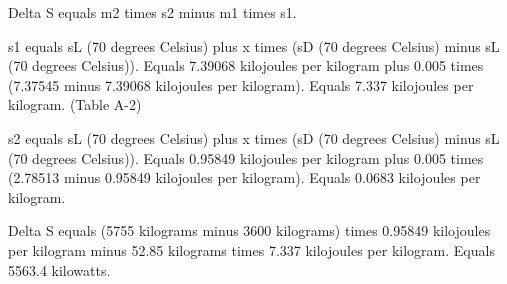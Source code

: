 Delta S equals m2 times s2 minus m1 times s1.  

s1 equals sL (70 degrees Celsius) plus x times (sD (70 degrees Celsius) minus sL (70 degrees Celsius)).  
Equals 7.39068 kilojoules per kilogram plus 0.005 times (7.37545 minus 7.39068 kilojoules per kilogram).  
Equals 7.337 kilojoules per kilogram.  
(Table A-2)  

s2 equals sL (70 degrees Celsius) plus x times (sD (70 degrees Celsius) minus sL (70 degrees Celsius)).  
Equals 0.95849 kilojoules per kilogram plus 0.005 times (2.78513 minus 0.95849 kilojoules per kilogram).  
Equals 0.0683 kilojoules per kilogram.  

Delta S equals (5755 kilograms minus 3600 kilograms) times 0.95849 kilojoules per kilogram minus 52.85 kilograms times 7.337 kilojoules per kilogram.  
Equals 5563.4 kilowatts.